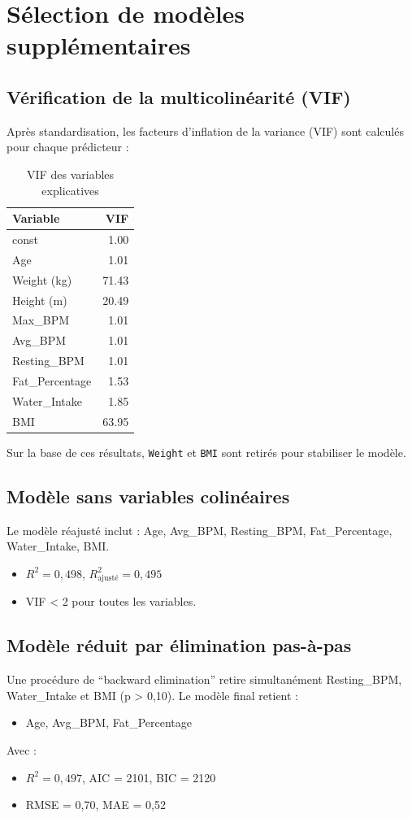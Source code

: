 \documentclass[12pt,a4paper]{article}
\begin{document}
\section{Sélection de modèles supplémentaires}

\subsection{Vérification de la multicolinéarité (VIF)}
Après standardisation, les facteurs d'inflation de la variance (VIF) sont calculés pour chaque prédicteur :

\begin{table}[H]
\centering
\caption{VIF des variables explicatives}
\begin{tabular}{l r}
\toprule
Variable & VIF \\
\midrule
const & 1.00 \\
Age & 1.01 \\
Weight (kg) & 71.43 \\
Height (m) & 20.49 \\
Max\_BPM & 1.01 \\
Avg\_BPM & 1.01 \\
Resting\_BPM & 1.01 \\
Fat\_Percentage & 1.53 \\
Water\_Intake & 1.85 \\
BMI & 63.95 \\
\bottomrule
\end{tabular}
\end{table}

Sur la base de ces résultats, \texttt{Weight} et \texttt{BMI} sont retirés pour stabiliser le modèle.

\subsection{Modèle sans variables colinéaires}
Le modèle réajusté inclut : Age, Avg\_BPM, Resting\_BPM, Fat\_Percentage, Water\_Intake, BMI.
\begin{itemize}
\item $R^2 = 0{,}498$, $R^2_{\text{ajusté}} = 0{,}495$
\item VIF < 2 pour toutes les variables.
\end{itemize}

\subsection{Modèle réduit par élimination pas-à-pas}
Une procédure de ``backward elimination'' retire simultanément Resting\_BPM, Water\_Intake et BMI (p > 0,10). Le modèle final retient :
\begin{itemize}
\item Age, Avg\_BPM, Fat\_Percentage
\end{itemize}
Avec :
\begin{itemize}
\item $R^2 = 0{,}497$, AIC = 2101, BIC = 2120
\item RMSE = 0{,}70, MAE = 0{,}52
\end{itemize}
\end{document}
